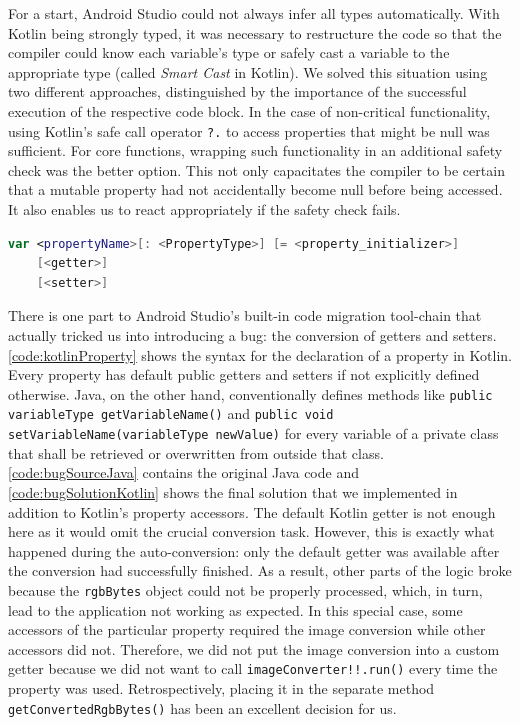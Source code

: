 \documentclass[
			   fontsize=11pt,
               paper=a4,
               bibliography=totoc,
               idxtotoc,
               headsepline,
               footsepline,
               footinclude=false,
               BCOR=12mm,
               DIV=13,
               openany,   %
               oneside    %
               ]
               {scrbook}
\newcommand{\code}[1]{\lstinline[basicstyle = \ttfamily\small]{#1}} %
\begin{document}
For a start, Android Studio could not always infer all types automatically. With Kotlin being strongly typed, it was necessary to restructure the code so that the compiler could know each variable's type or safely cast a variable to the appropriate type (called \textit{Smart Cast} in Kotlin). We solved this situation using two different approaches, distinguished by the importance of the successful execution of the respective code block. In the case of non-critical functionality, using Kotlin's safe call operator \code{?.} to access properties that might be null was sufficient. For core functions, wrapping such functionality in an additional safety check was the better option. This not only capacitates the compiler to be certain that a mutable property had not accidentally become null before being accessed. It also enables us to react appropriately if the safety check fails. \\

\begin{lstlisting}[style=standard, language=Kotlin, label=code:kotlinProperty, caption={Kotlin's declaration syntax for a mutable property. Getter and setter are optional. The property type is only optional when the compiler can infer it from the context (meaning either from the initializer or from the return type of the getter).}]
var <propertyName>[: <PropertyType>] [= <property_initializer>]
	[<getter>]
	[<setter>]
\end{lstlisting}

There is one part to Android Studio's built-in code migration tool-chain that actually tricked us into introducing a bug: the conversion of getters and setters. \autoref{code:kotlinProperty} shows the syntax for the declaration of a property in Kotlin. Every property has default public getters and setters if not explicitly defined otherwise. Java, on the other hand, conventionally defines methods like \code{public variableType getVariableName()} and \code{public void setVariableName(variableType newValue)} for every variable of a private class that shall be retrieved or overwritten from outside that class. \\

\autoref{code:bugSourceJava} contains the original Java code and \autoref{code:bugSolutionKotlin} shows the final solution that we implemented in addition to Kotlin's property accessors. The default Kotlin getter is not enough here as it would omit the crucial conversion task. However, this is exactly what happened during the auto-conversion: only the default getter was available after the conversion had successfully finished. As a result, other parts of the logic broke because the \code{rgbBytes} object could not be properly processed, which, in turn, lead to the application not working as expected. In this special case, some accessors of the particular property required the image conversion while other accessors did not. Therefore, we did not put the image conversion into a custom getter because we did not want to call \code{imageConverter!!.run()} every time the property was used. Retrospectively, placing it in the separate method \code{getConvertedRgbBytes()} has been an excellent decision for us.
\end{document}
